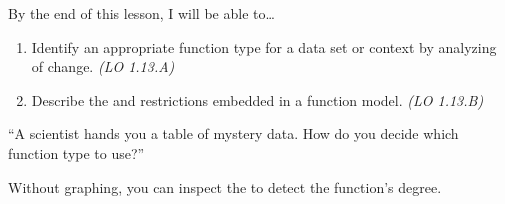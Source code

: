 \documentclass[10pt]{article}
\begin{document}
\namedateperiod

\vspace{0.08in}

\begin{objectivebox}
By the end of this lesson, I will be able to\ldots
\begin{enumerate}[itemsep=2pt]
  \item Identify an appropriate function type for a data set or context by analyzing
        \blank{3.5cm} of change. \hfill\textit{(LO 1.13.A)}
  \item Describe the \blank{2.8cm} and \blank{2.8cm} restrictions embedded in a function model.
        \hfill\textit{(LO 1.13.B)}
\end{enumerate}
\end{objectivebox}

\vspace{0.06in}

\begin{vocabbox}
\end{vocabbox}

\vspace{0.06in}

\begin{hookbox}
``A scientist hands you a table of mystery data. How do you decide which function type to use?''

\medskip
Without graphing, you can inspect the \blank{3cm} to detect the function's degree.
\end{hookbox}

\vspace{0.06in}
\end{document}
